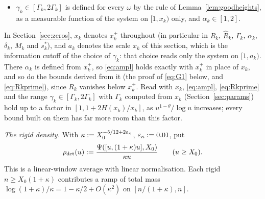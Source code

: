 \begin{itemize}
The relative amplitude $\kappa_0/\log x_k$ at the switch-on is what places the designed zero at distance
$\asymp\log\log x_k/\log x_k$ from the line $\sigma=1$ (Lemma~\ref{lem:designedzero}). The condition gives $|R'(x)|\le\kappa_+/\log x$ with $\kappa_+=0.8$ (see \eqref{eq:G1}).
\item $\gamma_k\in[\Gamma_k,2\Gamma_k]$ is defined for every $\omega$ by the rule of Lemma~\ref{lem:goodheights}, as a measurable
function of the system on $[1,x_k)$ only, and $\alpha_k\in[1,2]$.
\end{itemize}
In Section~\ref{sec:zeros}, $x_k$ denotes $x_k^+$ throughout (in particular in $R_k$, $\widehat R_k$, $\Gamma_k$, $\alpha_k$, $\delta_k$, $M_k$
and $s^*_k$), and $a_k$ denotes
the scale $x_k$ of this section, which is the information cutoff of the choice of $\gamma_k$: that choice reads only the system on
$[1,a_k)$. There $\alpha_k$ is defined from $x_k^+$, so \eqref{eq:ampl} holds exactly with $x_k^+$ in place of $x_k$, and so do the
bounds derived from it (the proof of \eqref{eq:G1} below, and \eqref{eq:Rkprime}), since $R_k$ vanishes below $x_k^+$. Read with $x_k$,
\eqref{eq:ampl}, \eqref{eq:Rkprime} and the range $\gamma_k\in[\Gamma_k,2\Gamma_k]$ with $\Gamma_k$ computed from $x_k$
(Section~\ref{sec:params}) hold up to a factor in $[1,1+2H(x_k)/x_k]$, as $u^{1-\theta}/\log u$ increases; every bound built on them
has far more room than this factor.

\emph{The rigid density.} With $\kappa:=X_0^{-5/12+2\varepsilon_\kappa}$, $\varepsilon_\kappa:=0.01$, put
\begin{equation}\label{eq:rhodet}
  \rho_{\mathrm{det}}(u):=\frac{\Psi([u,(1+\kappa)u],X_0)}{\kappa u}\qquad(u\ge X_0).
\end{equation}
This is a linear-window average with linear normalisation. Each rigid $n\ge X_0(1+\kappa)$ contributes a ramp of total mass
$\log(1+\kappa)/\kappa=1-\kappa/2+O(\kappa^2)$ on $[n/(1+\kappa),n]$.

